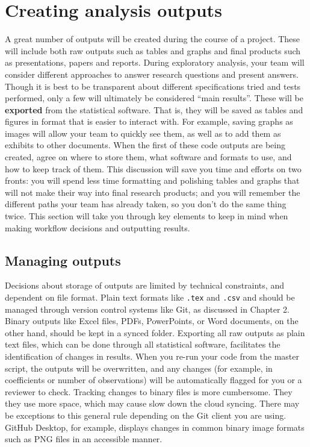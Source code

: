 \section{Creating analysis outputs}

A great number of outputs will be created during the course of a project.
These will include both raw outputs such as tables and graphs
and final products such as presentations, papers and reports.
During exploratory analysis, your team will consider different approaches
to answer research questions and present answers.
Though it is best to be transparent about different
specifications tried and tests performed,
only a few will ultimately be considered ``main results''.
These will be \textbf{exported}
from the statistical software.
That is, they will be saved as tables and figures in format that is easier to interact with.
For example, saving graphs as images will allow your team to quickly see them,
as well as to add them as exhibits to other documents.
When the first of these code outputs are being created, agree on where to store them,
what software and formats to use, and how to keep track of them.
This discussion will save you time and efforts on two fronts:
you will spend less time formatting and polishing tables and graphs that
will not make their way into final research products;
and you will remember the different paths your team has already
taken, so you don't do the same thing twice.
This section will take you through key elements to keep in mind
when making workflow decisions and outputting results.


\subsection{Managing outputs}

Decisions about storage of outputs are limited by technical constraints,
and dependent on file format.
Plain text formats like \texttt{.tex} and \texttt{.csv}
and should be managed through version control systems like Git,
as discussed in Chapter 2.
Binary outputs like Excel files, PDFs, PowerPoints, or Word documents,
on the other hand, should be kept in a synced folder.
Exporting all raw outputs as plain text files,
which can be done through all statistical software,
facilitates the identification of changes in results.
When you re-run your code from the master script,
the outputs will be overwritten,
and any changes (for example, in coefficients or number of observations)
will be automatically flagged for you or a reviewer to check.
Tracking changes to binary files is more cumbersome.
They they use more space,
which may cause slow down the cloud syncing.
There may be exceptions to this general rule
depending on the Git client you are using.
GitHub Desktop, for example,
displays changes in common binary image formats such as PNG files
in an accessible manner.

